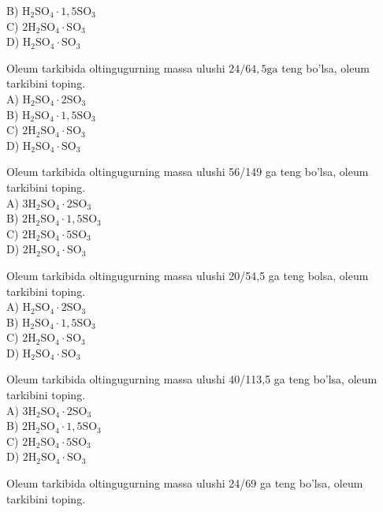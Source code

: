 B) $\mathrm{H}_{2} \mathrm{SO}_{4} \cdot 1,5 \mathrm{SO}_{3}$\\
C) $2 \mathrm{H}_{2} \mathrm{SO}_{4} \cdot \mathrm{SO}_{3}$\\
D) $\mathrm{H}_{2} \mathrm{SO}_{4} \cdot \mathrm{SO}_{3}$
  \item Oleum tarkibida oltingugurning massa ulushi $24 / 64,5 \mathrm{ga}$ teng bo'lsa, oleum tarkibini toping.\\
A) $\mathrm{H}_{2} \mathrm{SO}_{4} \cdot 2 \mathrm{SO}_{3}$\\
B) $\mathrm{H}_{2} \mathrm{SO}_{4} \cdot 1,5 \mathrm{SO}_{3}$\\
C) $2 \mathrm{H}_{2} \mathrm{SO}_{4} \cdot \mathrm{SO}_{3}$\\
D) $\mathrm{H}_{2} \mathrm{SO}_{4} \cdot \mathrm{SO}_{3}$
  \item Oleum tarkibida oltingugurning massa ulushi 56/149 ga teng bo'lsa, oleum tarkibini toping.\\
A) $3 \mathrm{H}_{2} \mathrm{SO}_{4} \cdot 2 \mathrm{SO}_{3}$\\
B) $2 \mathrm{H}_{2} \mathrm{SO}_{4} \cdot 1,5 \mathrm{SO}_{3}$\\
C) $2 \mathrm{H}_{2} \mathrm{SO}_{4} \cdot 5 \mathrm{SO}_{3}$\\
D) $2 \mathrm{H}_{2} \mathrm{SO}_{4} \cdot \mathrm{SO}_{3}$
  \item Oleum tarkibida oltingugurning massa ulushi 20/54,5 ga teng bolsa, oleum tarkibini toping.\\
A) $\mathrm{H}_{2} \mathrm{SO}_{4} \cdot 2 \mathrm{SO}_{3}$\\
B) $\mathrm{H}_{2} \mathrm{SO}_{4} \cdot 1,5 \mathrm{SO}_{3}$\\
C) $2 \mathrm{H}_{2} \mathrm{SO}_{4} \cdot \mathrm{SO}_{3}$\\
D) $\mathrm{H}_{2} \mathrm{SO}_{4} \cdot \mathrm{SO}_{3}$
  \item Oleum tarkibida oltingugurning massa ulushi 40/113,5 ga teng bo'lsa, oleum tarkibini toping.\\
A) $3 \mathrm{H}_{2} \mathrm{SO}_{4} \cdot 2 \mathrm{SO}_{3}$\\
B) $2 \mathrm{H}_{2} \mathrm{SO}_{4} \cdot 1,5 \mathrm{SO}_{3}$\\
C) $2 \mathrm{H}_{2} \mathrm{SO}_{4} \cdot 5 \mathrm{SO}_{3}$\\
D) $2 \mathrm{H}_{2} \mathrm{SO}_{4} \cdot \mathrm{SO}_{3}$
  \item Oleum tarkibida oltingugurning massa ulushi 24/69 ga teng bo'lsa, oleum tarkibini toping.\\
